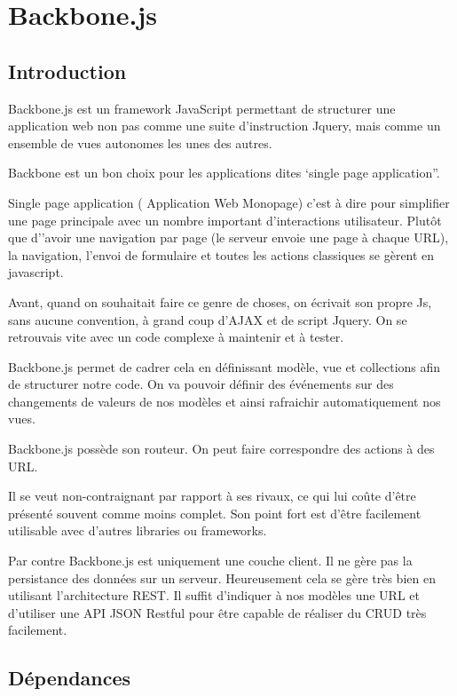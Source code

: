 \chapter{Backbone.js}
\label{ch:backbone}

\section*{Introduction}

Backbone.js est un framework JavaScript permettant de structurer une application web non pas comme une suite d’instruction Jquery, mais comme un ensemble de vues autonomes les unes des autres.

Backbone est un bon choix pour les applications dites ‘single page application”.

Single page application ( Application Web Monopage) c’est à dire pour simplifier une page principale avec un nombre important d'interactions utilisateur. Plutôt que d’’avoir une navigation par page (le serveur envoie une page à chaque URL), la navigation, l’envoi de formulaire et toutes les actions classiques se gèrent en javascript.

Avant, quand on souhaitait faire ce genre de choses, on écrivait son propre Js, sans aucune convention, à grand coup d’AJAX et de script Jquery. On se retrouvais vite avec un code complexe à maintenir et à tester.

Backbone.js permet de cadrer cela en définissant modèle, vue et collections afin de structurer notre code. On va pouvoir définir des événements sur des changements de valeurs de nos modèles et ainsi rafraichir automatiquement nos vues.

Backbone.js possède son routeur. On peut faire correspondre des actions à des URL.

Il se veut non-contraignant par rapport à ses rivaux, ce qui lui coûte d’être présenté souvent comme moins complet. Son point fort est d’être facilement utilisable avec d’autres libraries ou frameworks.

Par contre Backbone.js est uniquement une couche client. Il ne gère pas la persistance des données sur un serveur. Heureusement cela se gère très bien en utilisant l’architecture REST. Il suffit d’indiquer à nos modèles une URL et d’utiliser une API JSON Restful pour être capable de réaliser du CRUD très facilement. 


\section*{Dépendances}


